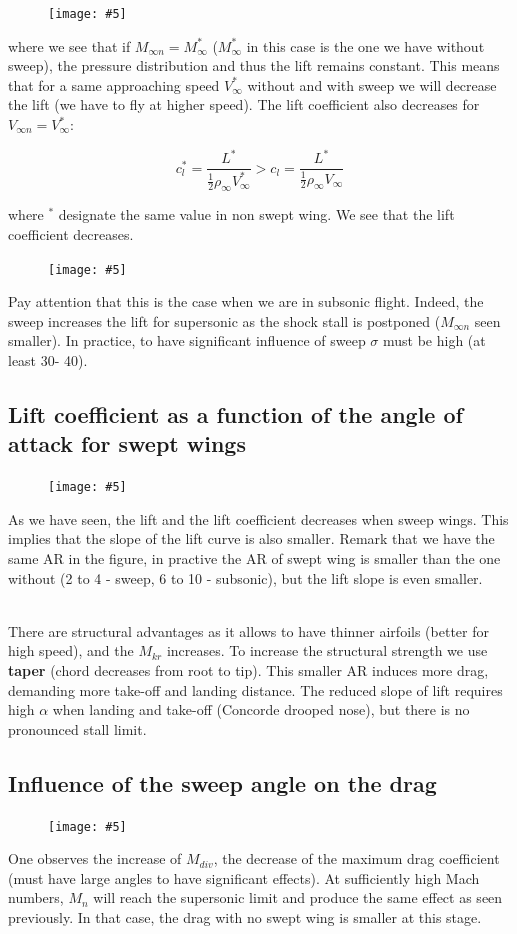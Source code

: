\documentclass[british,french,11pt, a4paper, openany]{article}
\newcommand{\wrapfig}[6]{%
	\begin{figure}%
		\vspace{-5mm}%
		\texttt{[image: \#5]}%
		\captionof{figure}{}%
		\label{#6}%
	\end{figure}%
}
\begin{document}
\wrapfig{11}{l}{4.5}{0.12}{ch7/4}{ch7/4}
where we see that if $M_{\infty n} = M_\infty^*$ ($M_\infty^*$ in this case is the one we have without sweep), the pressure distribution and thus the lift remains constant. This means that for a same approaching speed $V_\infty^*$ without and with sweep we will decrease the lift (we have to fly at higher speed). The lift coefficient also decreases for $V_{\infty n} = V_\infty^*$:

\begin{equation}
c_{l}^* = \frac{L^*}{\frac{1}{2}\rho _\infty V_{\infty}^*} > c_{l} = \frac{L^*}{\frac{1}{2}\rho _\infty V_{\infty}}
\end{equation}

where $^*$ designate the same value in non swept wing. We see that the lift coefficient decreases. 

\wrapfig{5}{l}{6}{0.15}{ch7/5}{ch7/5}
Pay attention that this is the case when we are in subsonic flight. Indeed, the sweep increases the lift for supersonic as the shock stall is postponed ($M_{\infty n}$ seen smaller). In practice, to have significant influence of sweep $\sigma$ must be high (at least 30\degres - 40\degres). 

\subsection{Lift coefficient as a function of the angle of attack for swept wings}	
\wrapfig{8}{r}{6}{0.15}{ch7/6}{ch7/6}
As we have seen, the lift and the lift coefficient decreases when sweep wings. This implies that the slope of the lift curve is also smaller. Remark that we have the same AR in the figure, in practive the AR of swept wing is smaller than the one without (2 to 4 - sweep, 6 to 10 - subsonic), but the lift slope is even smaller. 

\ \\ There are structural advantages as it allows to have thinner airfoils (better for high speed), and the $M_{kr}$ increases. To increase the structural strength we use \textbf{taper} (chord decreases from root to tip). This smaller AR induces more drag, demanding more take-off and landing distance. The reduced slope of lift requires high $\alpha$ when landing and take-off (Concorde drooped nose), but there is no pronounced stall limit.    

\subsection{Influence of the sweep angle on the drag}	
\wrapfig{7}{l}{6}{0.1}{ch7/7}{ch7/7}
One observes the increase of $M_{div}$, the decrease of the maximum drag coefficient (must have large angles to have significant effects). At sufficiently high Mach numbers, $M_n$ will reach the supersonic limit and produce the same effect as seen previously. In that case, the drag with no swept wing is smaller at this stage. 
\end{document}

